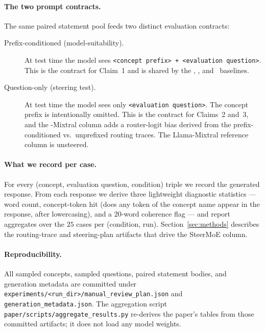 \paragraph{The two prompt contracts.}
The same paired statement pool feeds two distinct evaluation contracts:

\begin{description}
  \item[Prefix-conditioned (model-suitability).] At test time the model sees
  \texttt{<concept prefix> + <evaluation question>}. This is the contract for
  Claim~1 and is shared by the \llama, \olmoe, and \mixtral~baselines.
  \item[Question-only (steering test).] At test time the model sees only
  \texttt{<evaluation question>}. The concept prefix is intentionally
  omitted. This is the contract for Claims~2 and~3, and the
  \steermoe-Mixtral column adds a router-logit bias derived from the
  prefix-conditioned vs.\ unprefixed routing traces. The Llama-Mixtral
  reference column is unsteered.
\end{description}

\paragraph{What we record per case.}
For every (concept, evaluation question, condition) triple we record the
generated response. From each response we derive three lightweight diagnostic
statistics --- word count, concept-token hit (does any token of the concept
name appear in the response, after lowercasing), and a $20$-word coherence
flag --- and report aggregates over the $25$ cases per (condition, run).
Section~\ref{sec:methods} describes the routing-trace and steering-plan
artifacts that drive the SteerMoE column.

\paragraph{Reproducibility.}
All sampled concepts, sampled questions, paired statement bodies, and
generation metadata are committed under
\texttt{experiments/<run\_dir>/manual\_review\_plan.json} and
\texttt{generation\_metadata.json}. The aggregation script
\texttt{paper/scripts/aggregate\_results.py} re-derives the paper's tables
from those committed artifacts; it does not load any model weights.
